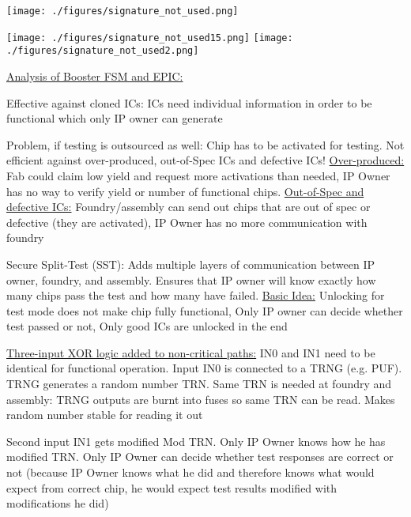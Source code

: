 \documentclass[landscape, a4paper]{article}
\begin{document}
\begin{minipage}[t]{0.2\linewidth}
\begin{betterlist}
\begin{betterlist}
			\begin{minipage}[b]{0.5\linewidth}

				\texttt{[image: ./figures/signature\_not\_used.png]}
			\end{minipage}
			\begin{minipage}[b]{0.5\linewidth}

				\texttt{[image: ./figures/signature\_not\_used15.png]}
				\texttt{[image: ./figures/signature\_not\_used2.png]}
			\end{minipage}

			\item \underline{Analysis of Booster FSM and EPIC:}
			\begin{betterlist}
				\item \alert{Effective against cloned ICs:} ICs need individual information in order to be functional which only IP owner can generate
				\item \alert{Problem, if testing is outsourced as well:} Chip has to be activated for testing. Not efficient against over-produced, out-of-Spec ICs and defective ICs! \underline{Over-produced:} Fab could claim low yield and request more activations than needed, IP Owner has no way to verify yield or number of functional chips. \underline{Out-of-Spec and defective ICs:} Foundry/assembly can send out chips that are out of spec or defective (they are activated), IP Owner has no more communication with foundry
			\end{betterlist}
			\item \alert{Secure Split-Test (SST):} Adds multiple layers of communication between IP owner, foundry, and assembly. Ensures that IP owner will know exactly how many chips pass the test and how many have failed. \underline{Basic Idea:} Unlocking for test mode does not make chip fully functional, Only IP owner can decide whether test passed or not, Only good ICs are unlocked in the end
			\begin{betterlist}
				\item \underline{Three-input XOR logic added to non-critical paths:} IN0 and IN1 need to be identical for functional operation. Input IN0 is connected to a TRNG (e.g. PUF). TRNG generates a random number TRN. \alert{Same TRN is needed at foundry and assembly:} TRNG outputs are burnt into fuses so same TRN can be read. Makes random number stable for reading it out
				\item Second input IN1 gets modified Mod TRN. Only IP Owner knows how he has modified TRN. Only IP Owner can decide whether test responses are correct or not (because IP Owner knows what he did and therefore knows what would expect from correct chip, he would expect test results modified with modifications he did)

\end{betterlist}
\end{betterlist}
\end{betterlist}
\end{minipage}
\end{document}
